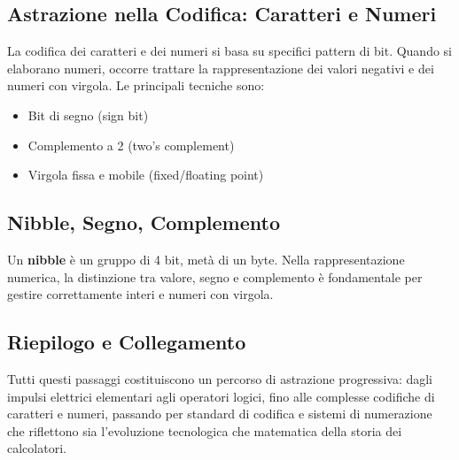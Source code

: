 \documentclass{article}
\begin{document}
\subsection{Astrazione nella Codifica: Caratteri e Numeri}
La codifica dei caratteri e dei numeri si basa su specifici pattern di bit. Quando si elaborano numeri, occorre trattare la rappresentazione dei valori negativi e dei numeri con virgola. Le principali tecniche sono:
\begin{itemize}
\item Bit di segno (sign bit)
\item Complemento a 2 (two's complement)
\item Virgola fissa e mobile (fixed/floating point)
\end{itemize}

\subsection{Nibble, Segno, Complemento}
Un \textbf{nibble} è un gruppo di 4 bit, metà di un byte. Nella rappresentazione numerica, la distinzione tra valore, segno e complemento è fondamentale per gestire correttamente interi e numeri con virgola.

\subsection{Riepilogo e Collegamento}
Tutti questi passaggi costituiscono un percorso di astrazione progressiva: dagli impulsi elettrici elementari agli operatori logici, fino alle complesse codifiche di caratteri e numeri, passando per standard di codifica e sistemi di numerazione che riflettono sia l'evoluzione tecnologica che matematica della storia dei calcolatori.
\end{document}
